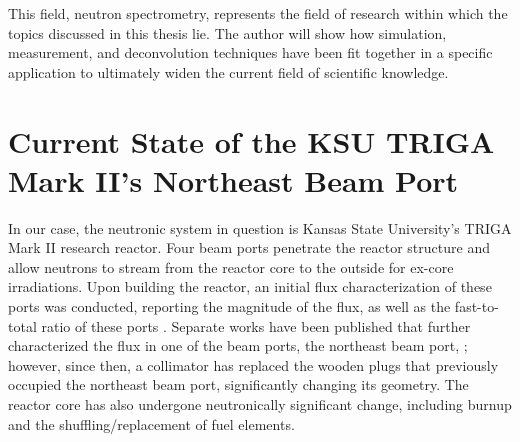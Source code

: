 This field, neutron spectrometry, represents the field of research within which the topics discussed in this thesis lie.
The author will show how simulation, measurement, and deconvolution techniques have been fit together in a specific application to ultimately widen the current field of scientific knowledge.



\section{Current State of the KSU TRIGA Mark II's Northeast Beam Port}
In our case, the neutronic system in question is Kansas State University's TRIGA Mark II research reactor.
Four beam ports penetrate the reactor structure and allow neutrons to stream from the reactor core to the outside for ex-core irradiations.
Upon building the reactor, an initial flux characterization of these ports was conducted, reporting the magnitude of the flux, as well as the fast-to-total ratio of these ports \cite{ksutrainingmanual}.
Separate works have been published that further characterized the flux in one of the beam ports, the northeast beam port, \cite{bouchey1967experimental} \cite{ryan1998analysis}; however, since then, a collimator has replaced the wooden plugs that previously occupied the northeast beam port, significantly changing its geometry.
The reactor core has also undergone neutronically significant change, including burnup and the shuffling/replacement of fuel elements.

